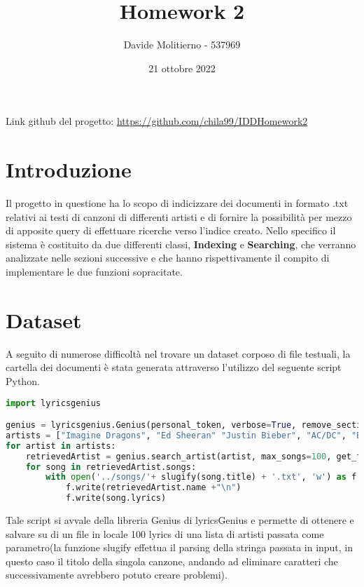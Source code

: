 \documentclass[12pt, letterpaper]{article}
\title{Homework 2}
\author{Davide Molitierno - 537969}
\date{21 ottobre 2022}
\begin{document}
\maketitle
Link github del progetto: \url{https://github.com/chila99/IDDHomework2}
\section{Introduzione}
Il progetto in questione ha lo scopo di indicizzare dei documenti in formato .txt relativi ai testi di canzoni di differenti artisti e di fornire la possibilità per mezzo di apposite query di effettuare ricerche verso l'indice creato. Nello specifico il sistema è costituito da due differenti classi, \textbf{Indexing} e \textbf{Searching}, che verranno analizzate nelle sezioni successive e che hanno rispettivamente il compito di implementare le due funzioni sopracitate.
\section{Dataset}
A seguito di numerose difficoltà nel trovare un dataset corposo di file testuali, la cartella dei documenti è stata generata attraverso l'utilizzo del seguente script Python.
\begin{lstlisting}[language=Python]
import lyricsgenius

genius = lyricsgenius.Genius(personal_token, verbose=True, remove_section_headers=True, skip_non_songs=True, retries=5, timeout=120)
artists = ["Imagine Dragons", "Ed Sheeran" "Justin Bieber", "AC/DC", "Bad Bunny", "Beyonce", "Tiziano Ferro"]
for artist in artists:
    retrievedArtist = genius.search_artist(artist, max_songs=100, get_full_info=False)
    for song in retrievedArtist.songs:
        with open('../songs/'+ slugify(song.title) + '.txt', 'w') as f:
            f.write(retrievedArtist.name +"\n")
            f.write(song.lyrics)
\end{lstlisting}
Tale script si avvale della libreria Genius di lyricsGenius e permette di ottenere e salvare su di un file in locale 100 lyrics di una lista di artisti passata come parametro(la funzione slugify effettua il parsing della stringa passata in input, in questo caso il titolo della singola canzone, andando ad eliminare caratteri che successivamente avrebbero potuto creare problemi).
\end{document}
